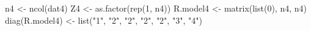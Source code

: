 \begin{Schunk}
\begin{Sinput}
 n4 <- ncol(dat4)
 Z4 <- as.factor(rep(1, n4))
 R.model4 <- matrix(list(0), n4, n4)
 diag(R.model4) <- list("1", "2", "2", "2", "2", "3", "4")
\end{Sinput}
\end{Schunk}
